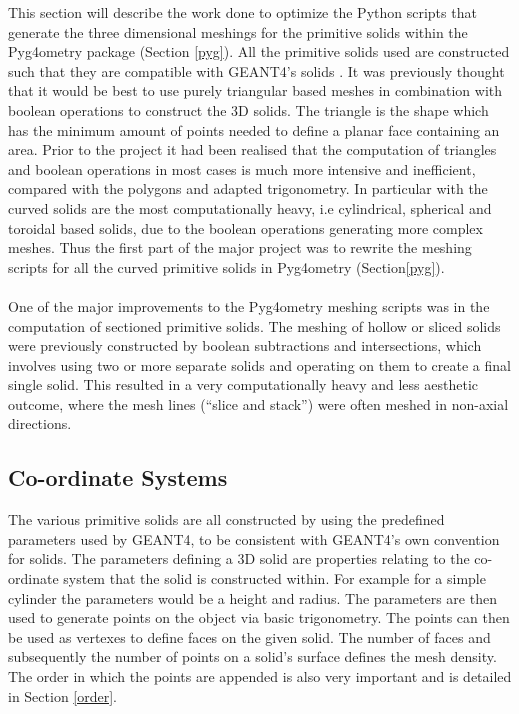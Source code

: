 \documentclass[12pt,a4paper]{article}
\begin{document}
This section will describe the work done to optimize the Python scripts that generate the three dimensional meshings for the primitive solids within the Pyg4ometry package (Section \ref{pyg}). All the primitive solids used are constructed such that they are compatible with GEANT4's solids \cite{solids}. It was previously thought that it would be best to use purely triangular based meshes in combination with boolean operations to construct the 3D solids. The triangle is the shape which has the minimum amount of points needed to define a planar face containing an area. Prior to the project it had been realised that the computation of triangles and boolean operations in most cases is much more intensive and inefficient, compared with the polygons and adapted trigonometry. In particular with the curved solids are the most computationally heavy, i.e cylindrical, spherical and toroidal based solids, due to the boolean operations generating more complex meshes. Thus the first part of the major project was to rewrite the meshing scripts for all the curved primitive solids in Pyg4ometry (Section\ref{pyg}).
\\\\
One of the major improvements to the Pyg4ometry meshing scripts was in the computation of sectioned primitive solids. The meshing of hollow or sliced solids were previously constructed by boolean subtractions and intersections, which involves using two or more separate solids and operating on them to create a final single solid. This resulted in a very computationally heavy and less aesthetic outcome, where the mesh lines (``slice and stack'') were often meshed in non-axial directions.

\subsection{Co-ordinate Systems}
\label{cosy}
The various primitive solids are all constructed by using the predefined parameters used by GEANT4, to be consistent with GEANT4's own convention for solids. The parameters defining a 3D solid are properties relating to the co-ordinate system that the solid is constructed within. For example for a simple cylinder the parameters would be a height and radius. The parameters are then used to generate points on the object via basic trigonometry. The points can then be used as vertexes to define faces on the given solid. The number of faces and subsequently the number of points on a solid's surface defines the mesh density. The order in which the points are appended is also very important and is detailed in Section \ref{order}.
\\\\
\end{document}
